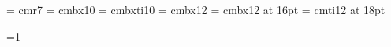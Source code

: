 
%



\font\small = cmr7
\font\sxmplbx = cmbx10 
\font\sxmplbxti = cmbxti10 
\font\xmplbx = cmbx12 %
\font\mxmplbx = cmbx12 at 16pt
\font\bxmplbx = cmti12 at 18pt %

\def\title#1{%
{\bxmplbx {\centerline {#1}}}
\vskip .2in
  {\leftskip = 2.5in%
  \par\noindent\llap{\hbox to 2.5in{\hfil {\bf Author:} }}{\it R. Scott
  McIntire}\par\noindent {\it Financial Engineering}%
  }%
\vskip .1in
 {\leftskip = 2.5in%
  \par\noindent\llap{\hbox to 2.5in{\hfil {\bf Date:} }} \date \par%
  }%
\vskip .25in
\hrule height 1pt
\vskip .1in
}

\def\section#1{\vskip .5in \centerline{\mxmplbx #1} \bigskip}

\def\subsection#1{\vskip .25 in \leftline{\xmplbx #1} \medskip}

=1
\def\chapter#1{%
\vfil
\supereject
{\bxmplbx {\centerline {Chapter \number\count3: #1}}}
\vskip .2in
\hrule height 1pt
\vskip .2in
\ifnum \count3 = 1 \pageno=1 \fi
\global\advance\count3 by 1
}%

\def\appendix#1{%
\vfil
\supereject
\section{#1}
}%

\def\titledate#1#2{%
{\bxmplbx {\centerline {#1}}}
\vskip .2in
  {\leftskip = 2.5in%
  \par\noindent\llap{\hbox to 2.5in{\hfil {\bf Author:} }}{\it R. Scott
  McIntire}\par\noindent {\it Financial Engineering}%
  }%
\vskip .1in
 {\leftskip = 2.5in%
  \par\noindent\llap{\hbox to 2.5in{\hfil {\bf Date:} }}#2 \par%
  }%
\vskip .25in
\hrule height 1pt
\vskip .1in
}


